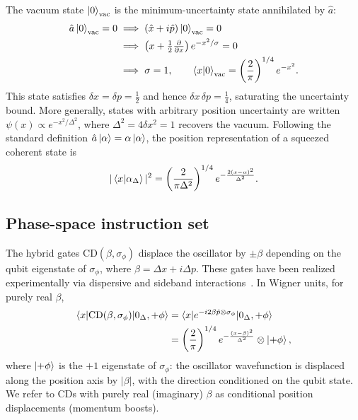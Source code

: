 \documentclass[aps,prx,showpacs,notitlepage,twocolumn,superscriptaddress,nofootinbib,preprintnumbers,floatfix,10pt, longbibliography]{revtex4-2}
\begin{document}
The vacuum state $\ket{0}_\mathrm{vac}$ is the minimum-uncertainty state
annihilated by $\hat{a}$:
\begin{align}
  \hat{a}\ket{0}_\mathrm{vac} = 0
  &\implies (\hat{x}+i\hat{p})\ket{0}_\mathrm{vac} = 0 \nonumber\\
  &\implies \left(x + \tfrac{1}{2}\tfrac{\partial}{\partial x}\right)
    e^{-x^2/\sigma} = 0 \nonumber\\
  &\implies \sigma = 1, \qquad
    \braket{x|0}_\mathrm{vac} = \left(\frac{2}{\pi}\right)^{1/4}e^{-x^2}.
\end{align}
This state satisfies $\delta x = \delta p = \frac{1}{2}$ and hence
$\delta x\,\delta p = \frac{1}{4}$, saturating the uncertainty bound.
More generally, states with arbitrary position uncertainty are written
$\psi(x)\propto e^{-x^2/\Delta^2}$, where $\Delta^2 = 4\delta x^2 = 1$
recovers the vacuum.  Following the standard definition
$\hat{a}\ket{\alpha}=\alpha\ket{\alpha}$, the position representation of a
squeezed coherent state is
\begin{align}
  |\braket{x|\alpha_\Delta}|^2
  = \left(\frac{2}{\pi\Delta^2}\right)^{1/4}
    e^{-\frac{2(x-\alpha)^2}{\Delta^2}}.
\end{align}

\subsection{Phase-space instruction set}\label{phase-space}
The hybrid gates $\mathrm{CD}(\beta,\sigma_\phi)$ displace
the oscillator by $\pm\beta$ depending on the qubit eigenstate of
$\sigma_\phi$, where $\beta=\Delta x+i\Delta p$.  These gates have been
realized experimentally via dispersive and sideband
interactions~\cite{leghtas_hardware-efficient_2013,eickbusch2022fast,
fluhmann2019encoding,de2022error}.  In Wigner units, for purely real
$\beta$,
\begin{align}
  \braket{x|\mathrm{CD}(\beta,\sigma_\phi)|0_\Delta,{+\phi}}
  &= \braket{x|e^{-i2\beta\hat{p}\otimes\sigma_\phi}|0_\Delta,{+\phi}}
  \nonumber\\
  &= \left(\frac{2}{\pi}\right)^{1/4}
    e^{-\frac{(x-\beta)^2}{\Delta^2}}\otimes\ket{+\phi},
\end{align}
where $\ket{+\phi}$ is the $+1$ eigenstate of $\sigma_\phi$: the oscillator
wavefunction is displaced along the position axis by $|\beta|$, with the
direction conditioned on the qubit state.
We refer to $\mathrm{CD}$s with purely real (imaginary) $\beta$ as
conditional position displacements (momentum boosts).
\end{document}
